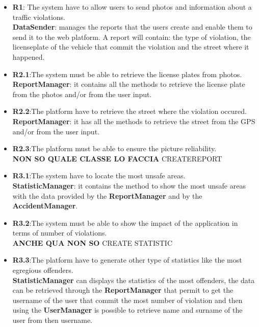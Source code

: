 \begin{itemize}
	\item
	\textbf{R1}: The system have to allow users to send photos and information about a traffic violations. \\
	\textbf{DataSender}: manages the reports that the users create and enable them to send it to the web platform. A report will contain: the type of violation, the licenseplate of the vehicle that commit the violation and the street where it happened.
	
	\item 
	\textbf{R2.1}:The system must be able to retrieve the license plates from photos. \\
	\textbf{ReportManager}: it contains all the methods to retrieve the license plate from the photos and/or from the user input. 
	
	\item 
	\textbf{R2.2}:The platform have to retrieve the street where the violation occured. \\
	\textbf{ReportManager}: it has all the methods to retrieve the street from the GPS and/or from the user input. 
	
	\item 
	\textbf{R2.3}:The platform must be able to ensure the picture reliability. \\
	\textbf{NON SO QUALE CLASSE LO FACCIA} CREATEREPORT
	
	\item 
	\textbf{R3.1}:The system have to locate the most unsafe areas. \\
	\textbf{StatisticManager}: it contains the method to show the most unsafe areas with the data provided by the \textbf{ReportManager} and by the \textbf{AccidentManager}.
	
	\item 
	\textbf{R3.2}:The system must be able to show the impact of the application in terms of number of violations. \\
	\textbf{ANCHE QUA NON SO} CREATE STATISTIC
	
	\item 
	\textbf{R3.3}:The platform have to generate other type of statistics like the most egregious offenders. \\
	\textbf{StatisticManager} can displays the statistics of the most offenders, the data can be retrieved through the \textbf{ReportManager} that permit to get the username of the user that commit the most number of violation and then using the \textbf{UserManager} is possible to retrieve name and surname of the user from then username.
	

\end{itemize}
